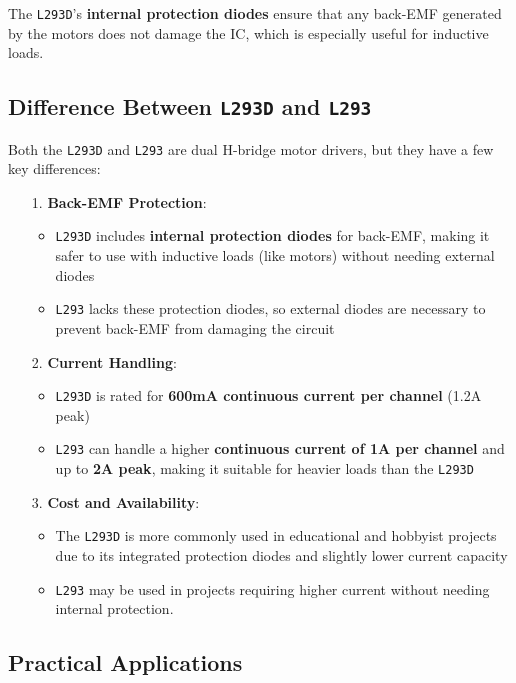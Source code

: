 \documentclass[a4paper,12pt]{article}
\begin{document}
The \texttt{L293D}'s \textbf{internal protection diodes} ensure that any back-EMF generated by the motors does not damage the IC, which is especially useful for inductive loads.

\subsection{Difference Between \texttt{L293D} and \texttt{L293}}
Both the \texttt{L293D} and \texttt{L293} are dual H-bridge motor drivers, but they have a few key differences:

\begin{itemize}
    \item[1.] \textbf{Back-EMF Protection}:
          \begin{itemize}
              \item \texttt{L293D} includes \textbf{internal protection diodes} for back-EMF, making it safer to use with inductive loads (like motors) without needing external diodes
              \item \texttt{L293} lacks these protection diodes, so external diodes are necessary to prevent back-EMF from damaging the circuit
          \end{itemize}
    \item[2.] \textbf{Current Handling}:
          \begin{itemize}
              \item \texttt{L293D} is rated for \textbf{600mA continuous current per channel} (1.2A peak)
              \item \texttt{L293} can handle a higher \textbf{continuous current of 1A per channel} and up to \textbf{2A peak}, making it suitable for heavier loads than the \texttt{L293D}
          \end{itemize}
    \item[3.] \textbf{Cost and Availability}:
          \begin{itemize}
              \item The \texttt{L293D} is more commonly used in educational and hobbyist projects due to its integrated protection diodes and slightly lower current capacity
              \item \texttt{L293} may be used in projects requiring higher current without needing internal protection.
          \end{itemize}
\end{itemize}

\subsection{Practical Applications}
\end{document}
